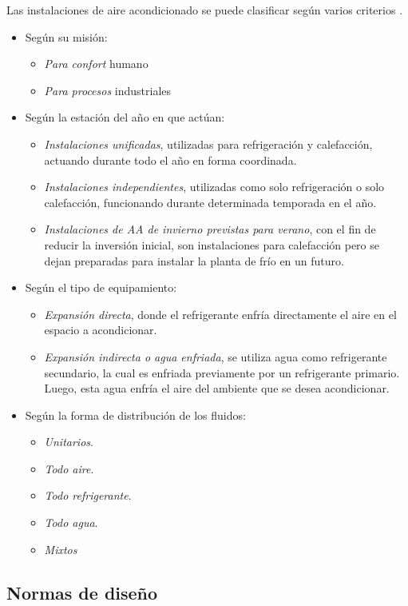 Las instalaciones de aire acondicionado se puede clasificar según varios criterios \parencite{quadri2020}.
\begin{itemize}
	\item Según su misión:
	\begin{itemize}
		\item \emph{Para confort} humano
		\item \emph{Para procesos} industriales
	\end{itemize}
	\item Según la estación del año en que actúan:
	\begin{itemize}
		\item \emph{Instalaciones unificadas}, utilizadas para refrigeración y calefacción, actuando durante todo el año en forma coordinada.
		\item \emph{Instalaciones independientes}, utilizadas como solo refrigeración o solo calefacción, funcionando durante determinada temporada en el año.
		\item \emph{Instalaciones de AA de invierno previstas para verano}, con el fin de reducir la inversión inicial, son instalaciones para calefacción pero se dejan preparadas para instalar la planta de frío en un futuro.
	\end{itemize}
	\item Según el tipo de equipamiento:
	\begin{itemize}
		\item \emph{Expansión directa}, donde el refrigerante enfría directamente el aire en el espacio a acondicionar.
		\item \emph{Expansión indirecta o agua enfriada}, se utiliza agua como refrigerante secundario, la cual es enfriada previamente por un refrigerante primario. Luego, esta agua enfría el aire del ambiente que se desea acondicionar.
	\end{itemize}
	\item Según la forma de distribución de los fluidos:
	\begin{itemize}
		\item \emph{Unitarios}.
		\item \emph{Todo aire}.
		\item \emph{Todo refrigerante}.
		\item \emph{Todo agua}.
		\item \emph{Mixtos}
	\end{itemize}
\end{itemize}
\subsection{Normas de diseño}

